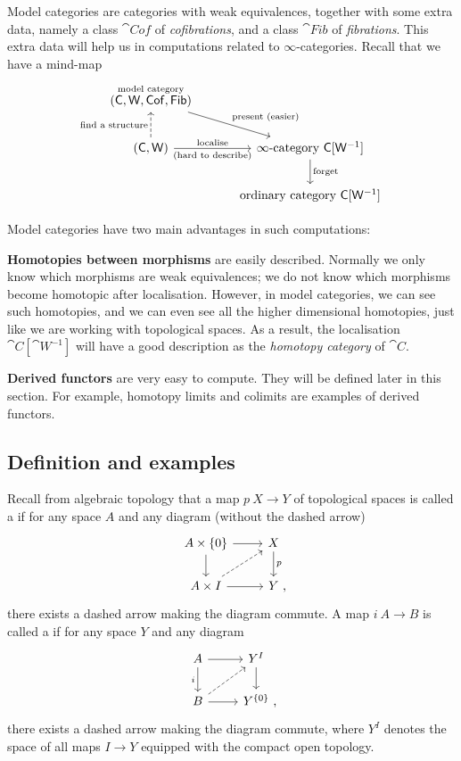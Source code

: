 Model categories are categories with weak equivalences,
together with some extra data, namely
a class $\cat{Cof}$ of \emph{cofibrations},
and a class $\cat{Fib}$ of \emph{fibrations}.
This extra data will help us in computations related to $∞$-categories. 
Recall that we have a mind-map
\[ \begin{tikzcd}[column sep=3em,row sep=2em]
    \overset{\text{model category}}{(\cat C,\cat W,\cat{Cof},\cat{Fib})} \ar[dr,"\text{present }(\text{easier})"] \\
    (\cat C,\cat W) \ar[u,dashed,"\text{find a structure}"] \ar[r,"\text{localise}","(\text{hard to describe})"']
    & \infty\text{-category }\cat C[\cat W^{-1}] \ar[d,"\text{forget}"] \\
    & \text{ordinary category }\cat C[\cat W^{-1}]
\end{tikzcd} \]

Model categories have two main advantages in such computations:
\begin{itms}
    \item \textbf{Homotopies between morphisms} are easily described.
    Normally we only know which morphisms are weak equivalences;
    we do not know which morphisms become homotopic after localisation.
    However, in model categories, we can see such homotopies,
    and we can even see all the higher dimensional homotopies,
    just like we are working with topological spaces.
    As a result, the localisation $\cat C[\cat W^{-1}]$
    will have a good description as the \emph{homotopy category} of $\cat C$.

    \item \textbf{Derived functors} are very easy to compute.
    They will be defined later in this section.
    For example, homotopy limits and colimits are examples of derived functors.
\end{itms}

\subsection{Definition and examples}

Recall from algebraic topology
that a map $p\:X\to Y$ of topological spaces is called a 
if for any space $A$ and any diagram (without the dashed arrow)
\[ \begin{tikzcd}
    A\times\{0\}\ar[r]\ar[d] & X\ar[d,"p"] \\
    A\times I\ar[r]\ar[ur,dashed] & Y\rlap{\ ,}
\end{tikzcd} \]
there exists a dashed arrow making the diagram commute.
A map $i\:A\to B$ is called a 
if for any space $Y$ and any diagram
\[ \begin{tikzcd}
    A\ar[r]\ar[d,"i"'] & Y^I\ar[d] \\
    B\ar[r]\ar[ur,dashed] & Y^{\{0\}}\rlap{\ ,}
\end{tikzcd} \]
there exists a dashed arrow making the diagram commute,
where $Y^I$ denotes the space of all maps $I\to Y$
equipped with the compact open topology.

